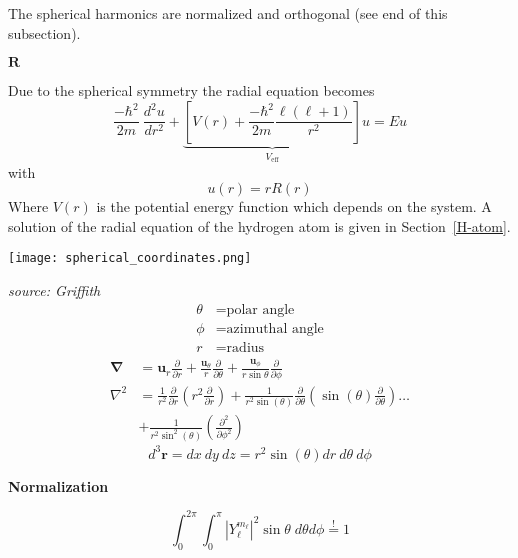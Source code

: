 The spherical harmonics are normalized and orthogonal (see end of this subsection).

\newpar{}
 $\mathbf{R}$

Due to the spherical symmetry the radial equation becomes
\begin{equation*}
    \frac{-\hbar^2}{2m}\:\frac{d^2u}{dr^2}+\underbrace{\left[V(r)+\frac{-\hbar^2}{2m}\frac{\ell(\ell+1)}{r^2}\right]}_{V_{\text{eff}}}u = Eu
\end{equation*}
with
\begin{equation*}
    u(r) = rR(r)
\end{equation*}
Where $V(r)$ is the potential energy function which depends on the system. A solution of the radial equation of the hydrogen atom is given in Section~\ref{H-atom}.

\newpar{}
\begin{center}
    \texttt{[image: spherical\_coordinates.png]}
\end{center}
\textit{source: Griffith}
\begin{align*}
    \theta & = \text{polar angle}     \\
    \phi   & = \text{azimuthal angle} \\
    r      & = \text{radius}
\end{align*}
\begin{align*}
    \mathbf{\nabla} & =\mathbf{u}_{r}\frac{\partial}{\partial r}+\frac{\mathbf{u}_{\theta}}{r}\frac{\partial}{\partial\theta}+\frac{\mathbf{u}_{\phi}}{r\sin\theta}\frac{\partial}{\partial\phi}                                      \\
    \nabla^2        & =\frac{1}{r^2}\frac{\partial}{\partial r}\left(r^2\frac{\partial}{\partial r}\right) + \frac{1}{r^2\sin(\theta)}\frac{\partial}{\partial\theta}\left(\sin(\theta)\frac{\partial}{\partial \theta}\right) \ldots \\
                    & + \frac{1}{r^2\sin^2(\theta)}\left(\frac{\partial^2}{\partial \phi^2}\right)
\end{align*}
\begin{equation*}
    d^3\mathbf{r} = dx\:dy\:dz = r^2\sin(\theta)dr\:d\theta\:d\phi
\end{equation*}

\textbf{Normalization}

\noindent\begin{equation*}
    \int_0^{2\pi}\int_0^{\pi} |Y_\ell^{m_\ell}|^2 \sin\theta\;d\theta d\phi \overset{!}{=} 1
\end{equation*}

